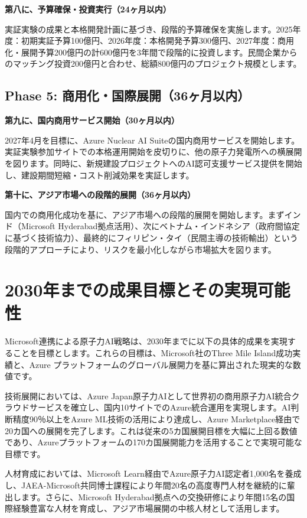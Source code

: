 \documentclass[10pt,a4paper]{jsarticle}
\begin{document}
\textbf{第八に、予算確保・投資実行（24ヶ月以内）}

実証実験の成果と本格開発計画に基づき、段階的予算確保を実施します。2025年度：初期実証予算100億円、2026年度：本格開発予算300億円、2027年度：商用化・展開予算200億円の計600億円を3年間で段階的に投資します。民間企業からのマッチング投資200億円と合わせ、総額800億円のプロジェクト規模とします。

\subsection{Phase 5: 商用化・国際展開（36ヶ月以内）}

\textbf{第九に、国内商用サービス開始（30ヶ月以内）}

2027年4月を目標に、Azure Nuclear AI Suiteの国内商用サービスを開始します。実証実験参加サイトでの本格運用開始を皮切りに、他の原子力発電所への横展開を図ります。同時に、新規建設プロジェクトへのAI認可支援サービス提供を開始し、建設期間短縮・コスト削減効果を実証します。

\textbf{第十に、アジア市場への段階的展開（36ヶ月以内）}

国内での商用化成功を基に、アジア市場への段階的展開を開始します。まずインド（Microsoft Hyderabad拠点活用）、次にベトナム・インドネシア（政府間協定に基づく技術協力）、最終的にフィリピン・タイ（民間主導の技術輸出）という段階的アプローチにより、リスクを最小化しながら市場拡大を図ります。

\section{2030年までの成果目標とその実現可能性}

Microsoft連携による原子力AI戦略は、2030年までに以下の具体的成果を実現することを目標とします。これらの目標は、Microsoft社のThree Mile Island成功実績と、Azure プラットフォームのグローバル展開力を基に算出された現実的な数値です。

技術展開においては、Azure Japan原子力AIとして世界初の商用原子力AI統合クラウドサービスを確立し、国内10サイトでのAzure統合運用を実現します。AI判断精度90％以上をAzure ML技術の活用により達成し、Azure Marketplace経由で20カ国への展開を完了します。これは従来の5カ国展開目標を大幅に上回る数値であり、Azureプラットフォームの170カ国展開能力を活用することで実現可能な目標です。

人材育成においては、Microsoft Learn経由でAzure原子力AI認定者1,000名を養成し、JAEA-Microsoft共同博士課程により年間20名の高度専門人材を継続的に輩出します。さらに、Microsoft Hyderabad拠点への交換研修により年間15名の国際経験豊富な人材を育成し、アジア市場展開の中核人材として活用します。
\end{document}
